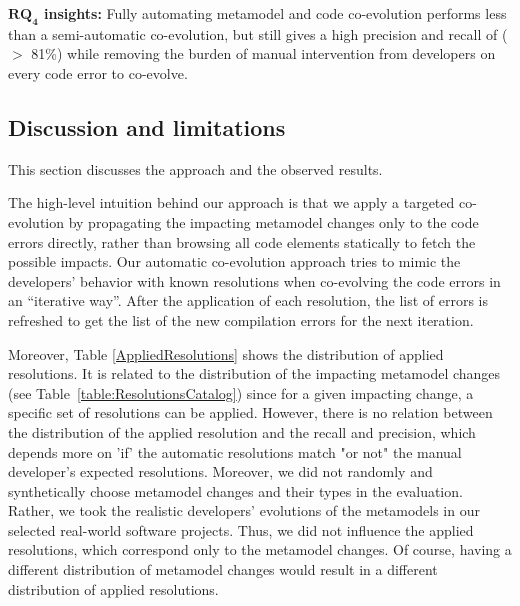 	
	\begin{tcolorbox}[boxsep=-2pt]
	\textbf{$\boldsymbol{RQ_4}$ insights:}
	Fully automating metamodel and code co-evolution performs less than a semi-automatic co-evolution, but still gives a high precision and recall of ($>$ 81\%) while removing the burden of manual intervention from developers on every code error to co-evolve. 
	\end{tcolorbox}
	
	
	\subsection{Discussion and limitations}
	This section discusses the approach and the observed results. 
	
	The high-level intuition behind our approach is that we apply a targeted co-evolution by propagating the impacting metamodel changes only to the code errors directly, rather than browsing all code elements statically to fetch the possible impacts.
	Our automatic co-evolution approach tries to mimic the developers' behavior with known resolutions when co-evolving the code errors in an “iterative way”. After the application of each resolution, the list of errors %
	is refreshed to get the list of the new compilation errors for the next iteration.
	
	Moreover, Table \ref{AppliedResolutions} shows the distribution of applied resolutions. It is related to the distribution of the impacting metamodel changes (see Table~\ref{table:ResolutionsCatalog}) since for a given impacting change, a specific set of resolutions can be applied. 
	However, there is no relation between the distribution of the applied resolution and the recall and precision, which depends more on 'if' the automatic resolutions match "or not" the manual developer’s expected resolutions. Moreover, we did not randomly and synthetically choose metamodel changes and their types in the evaluation. Rather, we took the realistic developers' evolutions of the metamodels in our selected real-world software projects. Thus, we did not influence the applied resolutions, which correspond only to the metamodel changes. Of course, having a different distribution of metamodel changes would result in a different distribution of applied resolutions. 
	
